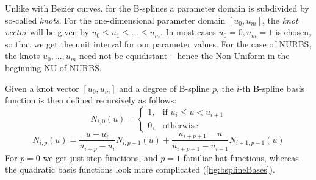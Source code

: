 Unlike with Bezier curves, for the B-splines a parameter domain is subdivided by so-called \textit{knots}. For the one-dimensional parameter domain $[u_{0}, u_{m}]$, the \textit{knot vector} will be given by $u_{0} \leq u_{1} \leq ... \leq u_{m}$. In most cases $u_{0} = 0, u_{m} = 1$ is chosen, so that we get the unit interval for our parameter values. For the case of NURBS, the knots $u_{0},..., u_{m}$ need not be equidistant -- hence the Non-Uniform in the beginning NU of NURBS.

Given a knot vector $[u_{0}, u_{m}]$ and a degree of B-spline $p$, the $i$-th B-spline basis function is then defined recursively as follows:
\begin{equation}
N_{i,0}(u) =  \begin{cases} 1, & \mbox{if } u_{i} \leq u < u_{i+1} \\ 0, & \mbox{otherwise } \end{cases}
\end{equation} 
\begin{equation}
N_{i,p}(u) = \frac{u - u_{i}}{u_{i+p} - u_{i}}N_{i, p-1}(u)  + \frac{u_{i+p+1}-u}{u_{i+p+1} - u_{i+1}}N_{i+1, p-1}(u)
\end{equation}
For $p=0$ we get just step functions, and $p=1$ familiar hat functions, whereas the quadratic basis functions look more complicated (\autoref{fig:bsplineBases}).

